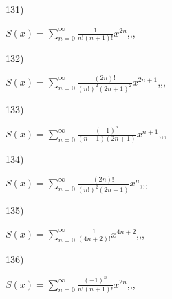 \documentclass[11pt, ukrainian]{article}
\begin{document}
\par
\vspace{0.9cm}
131) \space 
{%
{$S(x)=\sum\limits_{n=0}^{\infty}{\frac{1}{n!(n+1)!}}{x^{{2n}}}$},,, \par \smallskip  
}
\par
\vspace{0.9cm}
132) \space 
{%
{$S(x)=\sum\limits_{n=0}^{\infty}{\frac{(2n)!}{{(n!)^2}{(2n+1)^2}}}{x^{{2n+1}}}$},,, \par \smallskip  
}
\par
\vspace{0.9cm}
133) \space 
{%
{$S(x)=\sum\limits_{n=0}^{\infty}{\frac{(-1)^n}{(n+1)(2n+1)}}{x^{{n+1}}}$},,, \par \smallskip  
}
\par
\vspace{0.9cm}
134) \space 
{%
{$S(x)=\sum\limits_{n=0}^{\infty}{\frac{(2n)!}{(n!)^2(2n-1)}}{x^{n}}$},,, \par \smallskip  
}
\par
\vspace{0.9cm}
135) \space 
{%
{$S(x)=\sum\limits_{n=0}^{\infty}{\frac{1}{(4n+2)!}}{x^{{4n+2}}}$},,, \par \smallskip  
}
\par
\vspace{0.9cm}
136) \space 
{%
{$S(x)=\sum\limits_{n=0}^{\infty}{\frac{(-1)^n}{n!(n+1)!}}{x^{{2n}}}$},,, \par \smallskip  
}
\end{document}
